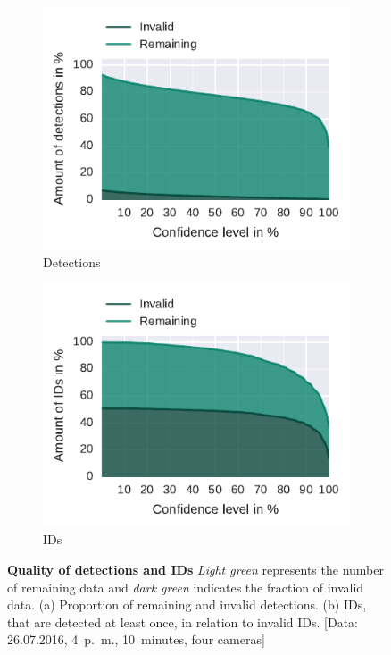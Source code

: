 \begin{figure}
    \centering
    \begin{subfigure}[b]{0.5\textwidth}
        \includegraphics[width=\textwidth]{Figures/detectionsWrongConf}
        \caption[Detections]{Detections}
        \label{fig:detections}
    \end{subfigure}%
    \begin{subfigure}[b]{0.5\textwidth}
        \includegraphics[width=\textwidth]{Figures/idsWrongConf}
        \caption[IDs]{IDs}
        \label{fig:ids}
    \end{subfigure}
 	\caption[Quality of detections and IDs]{\textbf{Quality of detections and IDs} \emph{Light green} represents the number of remaining data and \emph{dark green} indicates the fraction of invalid data. (a) Proportion of remaining and invalid detections. (b) IDs, that are detected at least once, in relation to invalid IDs.
 	[Data: 26.07.2016, 4~p.~m., 10~minutes, four cameras]}
 	\label{fig:remainingVSquality}
\end{figure}

